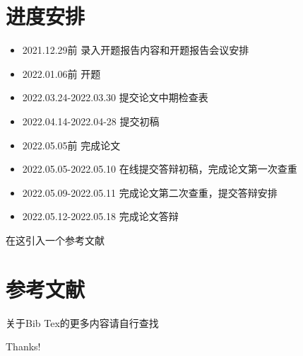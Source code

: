 \documentclass{beamer}
\begin{document}
	\section{进度安排}	
	
		\begin{frame}
			\begin{itemize}
				\item 2021.12.29前 录入开题报告内容和开题报告会议安排
				\item 2022.01.06前 开题
				\item 2022.03.24-2022.03.30 提交论文中期检查表
				\item 2022.04.14-2022.04-28 提交初稿
				\item 2022.05.05前 完成论文
				\item 2022.05.05-2022.05.10 在线提交答辩初稿，完成论文第一次查重
				\item 2022.05.09-2022.05.11 完成论文第二次查重，提交答辩安排
				\item 2022.05.12-2022.05.18 完成论文答辩
			\end{itemize}
			在这引入一个参考文献 \cite{name1}	
		\end{frame}
	
	\section{参考文献}
		
		\begin{frame}[allowframebreaks]
			
			
				
            
			关于Bib Tex的更多内容请自行查找
		\end{frame}

\begin{frame}
    \begin{center}
        {\Huge\calligra Thanks!}
    \end{center}
\end{frame}
\end{document}
